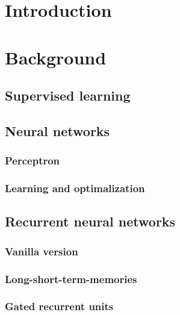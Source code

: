 \documentclass[a4paper, twoside]{article}
\begin{document}
\section{Introduction}
\label{sec:introduction}

\section{Background}
\label{sec:background}

\subsection{Supervised learning}
\label{sub:supervised_learning}

\subsection{Neural networks}
\label{sub:neural_networks}

\subsubsection{Perceptron}
\label{ssub:perceptron}

\subsubsection{Learning and optimalization}
\label{ssub:learning_and_optimalization}

\subsection{Recurrent neural networks}
\label{sub:recurrent_neural_networks}


\subsubsection{Vanilla version}
\label{ssub:vanilla_version}

\subsubsection{Long-short-term-memories}
\label{ssub:long_short_term_memories}

\subsubsection{Gated recurrent units}
\label{ssub:gated_recurrent_units}
\end{document}
